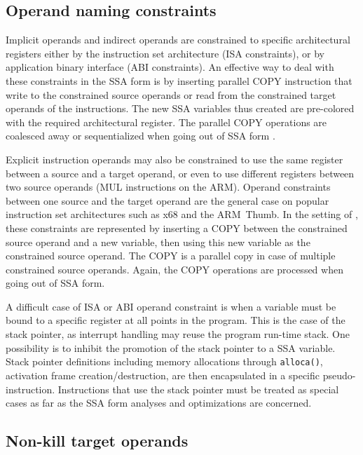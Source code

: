 \subsection{Operand naming constraints}

Implicit operands and indirect operands are constrained to specific
architectural registers either by the instruction set architecture (ISA
constraints), or by application binary interface (ABI constraints). An effective
way to deal with these constraints in the SSA form is by inserting parallel COPY
instruction that write to the constrained source operands or read from the
constrained target operands of the instructions. The new SSA variables thus
created are pre-colored with the required architectural register. The parallel
COPY operations are coalesced away or sequentialized when going out of SSA form
\cite{Boissinot:2009:CGO}.

Explicit instruction operands may also be constrained to use the same register
between a source and a target operand, or even to use different registers
between two source operands (MUL instructions on the ARM). Operand constraints
between one source and the target operand are the general case on popular
instruction set architectures such as x68 and the ARM~Thumb. In the setting of
\cite{Boissinot:2009:CGO}, these constraints are represented by inserting a COPY
between the constrained source operand and a new variable, then using this new
variable as the constrained source operand. The COPY is a parallel copy in case
of multiple constrained source operands. Again, the COPY operations are
processed when going out of SSA form.

A difficult case of ISA or ABI operand constraint is when a variable must be
bound to a specific register at all points in the program. This is the case of
the stack pointer, as interrupt handling may reuse the program run-time stack.
One possibility is to inhibit the promotion of the stack pointer to a SSA
variable. Stack pointer definitions including memory allocations through
\verb|alloca()|, activation frame creation/destruction, are then encapsulated in
a specific pseudo-instruction. Instructions that use the stack pointer must be
treated as special cases as far as the SSA form analyses and optimizations are
concerned.

\subsection{Non-kill target operands} \label{sec:non-kill-target}

